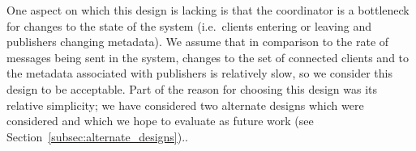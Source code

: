 One aspect on which this design is lacking is that the coordinator is a bottleneck for changes to the state of the system (i.e.\ clients entering or leaving and publishers changing metadata).
We assume that in comparison to the rate of messages being sent in the system, changes to the set of connected clients and to the metadata associated with publishers is relatively slow, so we consider this design to be acceptable.
Part of the reason for choosing this design was its relative simplicity; we have considered two alternate designs which were considered and which we hope to evaluate as future work (see Section~\ref{subsec:alternate_designs})..

